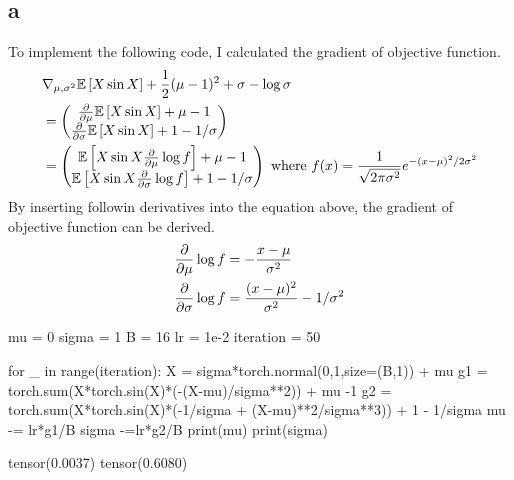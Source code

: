 \documentclass[10pt]{article}
\begin{document}
\subsection*{a}
To implement the following code, I calculated the gradient of objective function. 
\begin{align*}
    &\nabla_{\mu, \sigma^2} \mathbb{E}\left[X \sin X\right] + \frac{1}{2}(\mu - 1)^2 + \sigma - \log \sigma \\
    &= \begin{pmatrix}
        {\partial \over \partial \mu} \mathbb{E}\left[X \sin X\right]  + \mu -1 \\
        {\partial \over \partial \sigma} \mathbb{E}\left[X \sin X\right]  + 1  - 1/\sigma
    \end{pmatrix} \\
    &=  \begin{pmatrix}
        \mathbb{E}\left[X \sin X {\partial \over \partial \mu } \log f \right]  + \mu -1 \\
       \mathbb{E}\left[X \sin X  {\partial \over \partial \sigma} \log f \right]  + 1  - 1/\sigma 
    \end{pmatrix} \text{ where } f(x) = \frac{1}{\sqrt{2\pi \sigma^2}}e^{-(x-\mu)^2/2\sigma^2} 
\end{align*}
By inserting followin derivatives into the equation above, the gradient of objective function can be derived.
\begin{align*}
    {\partial \over \partial \mu } \log f &= -\frac{x-\mu}{\sigma^2}\\
    {\partial \over \partial \sigma } \log f &= \frac{(x-\mu)^2}{\sigma^2} - 1/\sigma^2
\end{align*}
\begin{python}
mu = 0
sigma = 1
B = 16
lr = 1e-2
iteration = 50

for _ in range(iteration):
    X = sigma*torch.normal(0,1,size=(B,1)) + mu
    g1 = torch.sum(X*torch.sin(X)*(-(X-mu)/sigma**2)) + mu -1
    g2 = torch.sum(X*torch.sin(X)*(-1/sigma + (X-mu)**2/sigma**3)) + 1 - 1/sigma
    mu -= lr*g1/B
    sigma -=lr*g2/B
print(mu)
print(sigma)
\end{python}
\begin{python}
tensor(0.0037)
tensor(0.6080)
\end{python}
\end{document}

